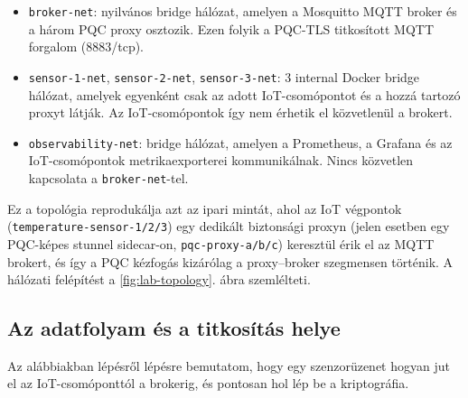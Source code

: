 \begin{itemize}
    \item \texttt{broker-net}: nyilvános bridge hálózat, amelyen a Mosquitto MQTT broker és a
          három PQC proxy osztozik. Ezen folyik a PQC-TLS titkosított MQTT forgalom (8883/tcp).
    \item \texttt{sensor-1-net}, \texttt{sensor-2-net}, \texttt{sensor-3-net}: 3 internal
          Docker bridge hálózat, amelyek egyenként csak az adott IoT-csomópontot és a hozzá
          tartozó proxyt látják. Az IoT-csomópontok így nem érhetik el közvetlenül a brokert.
    \item \texttt{observability-net}: bridge hálózat, amelyen a Prometheus, a Grafana és az
          IoT-csomópontok metrikaexporterei kommunikálnak. Nincs közvetlen kapcsolata a
          \texttt{broker-net}-tel.
\end{itemize}

Ez a topológia reprodukálja azt az ipari mintát, ahol az IoT végpontok
(\texttt{temperature-sensor-1/2/3}) egy dedikált biztonsági proxyn (jelen esetben egy PQC-képes
stunnel sidecar-on, \texttt{pqc-proxy-a/b/c}) keresztül érik el az MQTT brokert, és így a PQC
kézfogás kizárólag a proxy–broker szegmensen történik. A hálózati felépítést a
\ref{fig:lab-topology}. ábra szemlélteti.


\subsection{Az adatfolyam és a titkosítás helye}

Az alábbiakban lépésről lépésre bemutatom, hogy egy szenzorüzenet hogyan jut el az
IoT-csomóponttól a brokerig, és pontosan hol lép be a kriptográfia.

